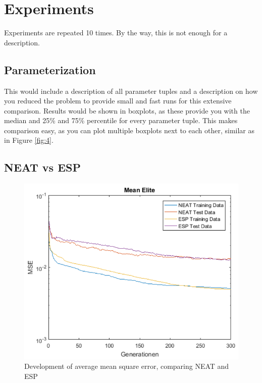\documentclass{hbrs-ecta-report}
\begin{document}
\FloatBarrier
\section{Experiments}
Experiments are repeated 10 times. By the way, this is not enough for a description.

\subsection{Parameterization}
This would include a description of all parameter tuples and a description on how you reduced the problem to provide small and fast runs for this extensive comparison. Results would be shown in boxplots, as these provide you with the median and 25\% and 75\% percentile for every parameter tuple. This makes comparison easy, as you can plot multiple boxplots next to each other, similar as in Figure \ref{fig:4}.

\subsection{NEAT vs ESP}

\begin{figure}[ht!]
\centering
\includegraphics[width=\linewidth]{img/1.png}
\caption{Development of average mean square error, comparing NEAT and ESP}
\label{fig:1} 
\end{figure}
 
\end{document}
